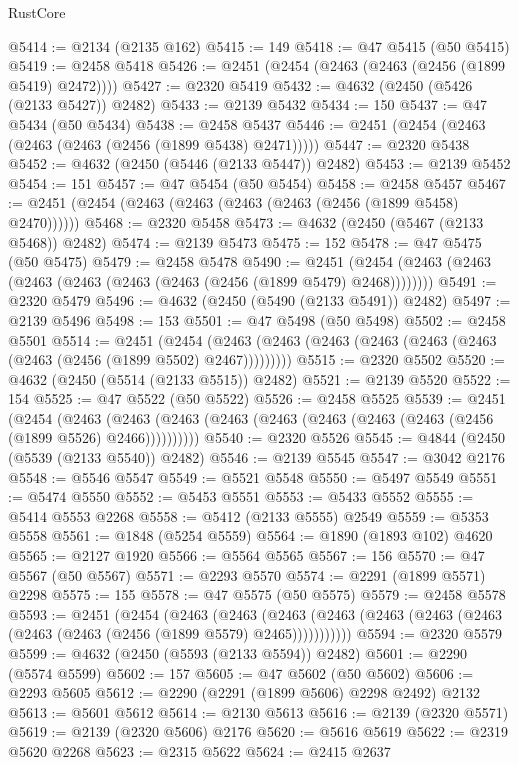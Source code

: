 \begin{lexlean}{RustCore}
\begin{coremodule}
@5414 := @2134 (@2135 @162)
@5415 := 149
@5418 := @47 @5415 (@50 @5415)
@5419 := @2458 @5418
@5426 := @2451 (@2454 (@2463 (@2463 (@2456 (@1899 @5419) @2472))))
@5427 := @2320 @5419
@5432 := @4632 (@2450 (@5426 (@2133 @5427)) @2482)
@5433 := @2139 @5432
@5434 := 150
@5437 := @47 @5434 (@50 @5434)
@5438 := @2458 @5437
@5446 := @2451 (@2454 (@2463 (@2463 (@2463 (@2456 (@1899 @5438) @2471)))))
@5447 := @2320 @5438
@5452 := @4632 (@2450 (@5446 (@2133 @5447)) @2482)
@5453 := @2139 @5452
@5454 := 151
@5457 := @47 @5454 (@50 @5454)
@5458 := @2458 @5457
@5467 := @2451 (@2454 (@2463 (@2463 (@2463 (@2463 (@2456 (@1899 @5458) @2470))))))
@5468 := @2320 @5458
@5473 := @4632 (@2450 (@5467 (@2133 @5468)) @2482)
@5474 := @2139 @5473
@5475 := 152
@5478 := @47 @5475 (@50 @5475)
@5479 := @2458 @5478
@5490 := @2451 (@2454 (@2463 (@2463 (@2463 (@2463 (@2463 (@2463 (@2456 (@1899 @5479) @2468))))))))
@5491 := @2320 @5479
@5496 := @4632 (@2450 (@5490 (@2133 @5491)) @2482)
@5497 := @2139 @5496
@5498 := 153
@5501 := @47 @5498 (@50 @5498)
@5502 := @2458 @5501
@5514 := @2451
    (@2454 (@2463 (@2463 (@2463 (@2463 (@2463 (@2463 (@2463 (@2456 (@1899 @5502) @2467)))))))))
@5515 := @2320 @5502
@5520 := @4632 (@2450 (@5514 (@2133 @5515)) @2482)
@5521 := @2139 @5520
@5522 := 154
@5525 := @47 @5522 (@50 @5522)
@5526 := @2458 @5525
@5539 := @2451
    (@2454
      (@2463 (@2463 (@2463 (@2463 (@2463 (@2463 (@2463 (@2463 (@2456 (@1899 @5526) @2466))))))))))
@5540 := @2320 @5526
@5545 := @4844 (@2450 (@5539 (@2133 @5540)) @2482)
@5546 := @2139 @5545
@5547 := @3042 @2176
@5548 := @5546 @5547
@5549 := @5521 @5548
@5550 := @5497 @5549
@5551 := @5474 @5550
@5552 := @5453 @5551
@5553 := @5433 @5552
@5555 := @5414 @5553 @2268
@5558 := @5412 (@2133 @5555) @2549
@5559 := @5353 @5558
@5561 := @1848 (@5254 @5559)
@5564 := @1890 (@1893 @102) @4620
@5565 := @2127 @1920
@5566 := @5564 @5565
@5567 := 156
@5570 := @47 @5567 (@50 @5567)
@5571 := @2293 @5570
@5574 := @2291 (@1899 @5571) @2298
@5575 := 155
@5578 := @47 @5575 (@50 @5575)
@5579 := @2458 @5578
@5593 := @2451
    (@2454
      (@2463
        (@2463
          (@2463 (@2463 (@2463 (@2463 (@2463 (@2463 (@2463 (@2456 (@1899 @5579) @2465)))))))))))
@5594 := @2320 @5579
@5599 := @4632 (@2450 (@5593 (@2133 @5594)) @2482)
@5601 := @2290 (@5574 @5599)
@5602 := 157
@5605 := @47 @5602 (@50 @5602)
@5606 := @2293 @5605
@5612 := @2290 (@2291 (@1899 @5606) @2298 @2492) @2132
@5613 := @5601 @5612
@5614 := @2130 @5613
@5616 := @2139 (@2320 @5571)
@5619 := @2139 (@2320 @5606) @2176
@5620 := @5616 @5619
@5622 := @2319 @5620 @2268
@5623 := @2315 @5622
@5624 := @2415 @2637

\end{coremodule}
\end{lexlean}
